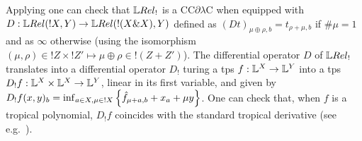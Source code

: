 Applying \cite[Theorem 6.1]{lemay2020} one can check that
 $\LREL_!$ is a CC$\partial\lambda$C when equipped with $D:\HOM{\LREL}{!X}{Y}\to \HOM{\LREL}{!(X\& X)}{Y}$ defined as $(Dt)_{\mu\oplus\rho,b}=t_{\rho+\mu,b}$ if $\#\mu=1$ and as $\infty$ otherwise (using the isomorphism $(\mu,\rho)\in !Z\times !Z'\mapsto\mu\oplus\rho \in !(Z+Z')$).
 The differential operator $D$ of $\LREL_{!}$ translates into a differential operator $D_{!}$ turing a tps $f:\mathbb{L}^{X}\to \mathbb{L}^{Y}$ into a tps $D_{!}f:\mathbb{L}^{X}\times \mathbb{L}^{X}\to \mathbb{L}^{Y}$, linear in its first variable, and given by 
$D_{!}f(x,y)_{b}=\inf_{a\in X, \mu\in !X}\left\{\hat{f}_{\mu+a,b}+x_{a}+\mu y\right\}$. %
One can check that, when $f$ is a tropical polynomial, $D_{!}f$ coincides with the standard tropical derivative (see e.g.~\cite{Grigoriev2017}).

